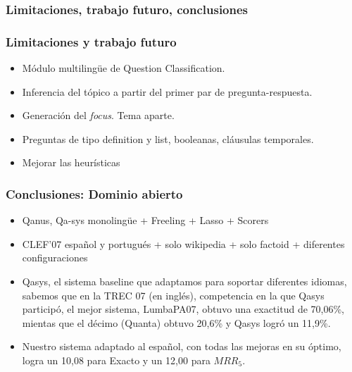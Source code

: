 \subsubsection*{Limitaciones, trabajo futuro, conclusiones}

\begin{frame}
\frametitle{Limitaciones y trabajo futuro}
\begin{itemize}
  \item Módulo multilingüe de Question Classification.
  \item Inferencia del tópico a partir del primer par de pregunta-respuesta.
  \item Generación del \textit{focus}. Tema aparte.
  \item Preguntas de tipo definition y list, booleanas, cláusulas temporales.
  \item Mejorar las heurísticas
\end{itemize}

\end{frame}


\begin{frame}
\frametitle{Conclusiones: Dominio abierto}
  \begin{itemize}
    \item Qanus, Qa-sys monolingüe + Freeling + Lasso + Scorers
    \item CLEF'07 español y portugués + solo wikipedia + solo factoid + diferentes configuraciones
    \item Qasys, el sistema baseline que adaptamos para soportar diferentes idiomas, sabemos que en la TREC 07 (en inglés), competencia en la que Qasys participó, el mejor sistema, LumbaPA07, obtuvo una exactitud de 70,06\%, mientas que el décimo (Quanta) obtuvo 20,6\% y Qasys logró un 11,9\%.
\item Nuestro sistema adaptado al español, con todas las mejoras en su óptimo, logra un 10,08 para Exacto y un 12,00 para $MRR_5$.
  \end{itemize}

\end{frame}

